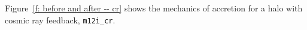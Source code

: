 \documentclass[fleqn,usenatbib]{mnras}
\newcommand{\Rcon}{R_{T=10^5\,{\rm K}}}
\begin{document}
Figure~\ref{f: before and after -- cr} shows the mechanics of accretion for a halo with cosmic ray feedback, \texttt{m12i\_cr}.





\bsp	%
\label{lastpage}
\end{document}
